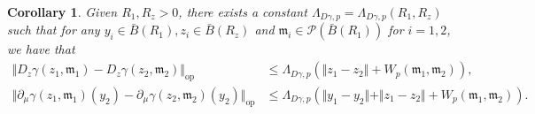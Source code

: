 \documentclass[10pt,a4paper]{amsart}
\newtheorem{corollary}{Corollary}
\begin{document}
\begin{corollary}\label{cor:LipGammaDerivs}
Given $R_1,R_z>0$, there exists a constant $\Lambda_{D\gamma,p}=\Lambda_{D\gamma,p}(R_1,R_z)$ such that for any $y_i\in \bar B(R_1), z_i\in \bar B(R_z)$ and $\mathfrak{m}_i\in \mathcal P(\bar B(R_1))$ for $i=1,2$, we have that
\begin{align*}
    \Vert D_z\gamma(z_1,\mathfrak{m}_1)-D_z\gamma(z_2,\mathfrak{m}_2)\Vert_\mathrm{op}&\le \Lambda_{D\gamma,p} \left(\Vert z_1-z_2\Vert +W_p(\mathfrak{m}_1,\mathfrak{m}_2) \right),\\
    \Vert \partial_\mu\gamma(z_1,\mathfrak{m}_1)(y_2)-\partial_\mu\gamma(z_2,\mathfrak{m}_2)(y_2)\Vert_\mathrm{op}&\le\Lambda_{D\gamma,p} \left(\Vert y_1-y_2\Vert+\Vert z_1-z_2\Vert +W_p(\mathfrak{m}_1,\mathfrak{m}_2) \right).
\end{align*}
\end{corollary}
\end{document}
